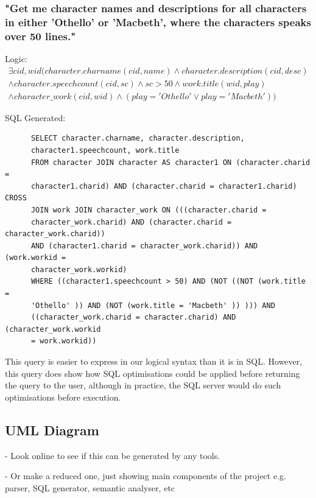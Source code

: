 \documentclass[a4paper, 11pt]{article}
\begin{document}
      \subsubsection*{"Get me character names and descriptions for all
        characters in either 'Othello' or 'Macbeth', where the characters
      speaks over 50 lines."}

      Logic:
      \begin{multline}
        \exists cid,wid(character.charname(cid, name) \land character.description(cid,
        desc) \\
        \land character.speechcount(cid, sc) \land sc > 50 
        \land work.title(wid, play) 
        \\ \land character\_work(cid, wid) \land (play = 'Othello' 
        \lor play = 'Macbeth'))
      \end{multline}

      SQL Generated:
      \begin{verbatim}
      SELECT character.charname, character.description,
      character1.speechcount, work.title
      FROM character JOIN character AS character1 ON (character.charid =
      character1.charid) AND (character.charid = character1.charid) CROSS
      JOIN work JOIN character_work ON (((character.charid =
      character_work.charid) AND (character.charid = character_work.charid))
      AND (character1.charid = character_work.charid)) AND (work.workid =
      character_work.workid)
      WHERE ((character1.speechcount > 50) AND (NOT ((NOT (work.title =
      'Othello' )) AND (NOT (work.title = 'Macbeth' )) ))) AND
      ((character_work.charid = character.charid) AND (character_work.workid
      = work.workid))
      \end{verbatim}

      This query is easier to express in our logical syntax than it is in SQL.
      However, this query does show how SQL optimisations could be applied
      before returning the query to the user, although in practice, the SQL
      server would do such optimisations before execution.

  \subsection{UML Diagram}

  - Look online to see if this can be generated by any tools.

  - Or make a reduced one, just showing main components of the project e.g.
  parser, SQL generator, semantic analyser, etc
\end{document}
